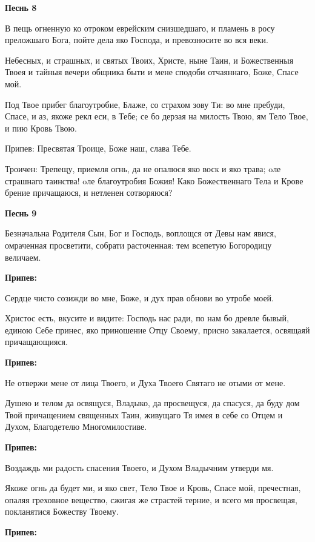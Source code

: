 \medskip
\bfseries Песнь 8\normalfont{}\nopagebreak


В пещь огненную ко отроком еврейским снизшедшаго, и пламень в росу преложшаго Бога, пойте дела яко Господа, и превозносите во вся веки.


Небесных, и страшных, и святых Твоих, Христе, ныне Таин, и Божественныя Твоея и тайныя вечери общника быти и мене сподоби отчаяннаго, Боже, Спасе мой.


Под Твое прибег благоутробие, Блаже, со страхом зову Ти: во мне пребуди, Спасе, и аз, якоже рекл еси, в Тебе; се бо дерзая на милость Твою, ям Тело Твое, и пию Кровь Твою.


Припев: Пресвятая Троице, Боже наш, слава Тебе.


Троичен: Трепещу, приемля огнь, да не опалюся яко воск и яко трава; oле страшнаго таинства! oле благоутробия Божия! Како Божественнаго Тела и Крове брение причащаюся, и нетленен сотворяюся?

\medskip
\bfseries Песнь 9\normalfont{}\nopagebreak


Безначальна Родителя Сын, Бог и Господь, воплощся от Девы нам явися, омраченная просветити, собрати расточенная: тем всепетую Богородицу величаем.

\medskip
\bfseries Припев:\normalfont{} 


Сердце чисто созижди во мне, Боже, и дух прав обнови во утробе моей.


Христос есть, вкусите и видите: Господь нас ради, по нам бо древле бывый, единою Себе принес, яко приношение Отцу Своему, присно закалается, освящаяй причащающияся.


\medskip
\bfseries Припев:\normalfont{} 


Не отвержи мене от лица Твоего, и Духа Твоего Святаго не отыми от мене.


Душею и телом да освящуся, Владыко, да просвещуся, да спасуся, да буду дом Твой причащением священных Таин, живущаго Тя имея в себе со Отцем и Духом, Благодетелю Многомилостиве.


\medskip
\bfseries Припев:\normalfont{} 


Воздаждь ми радость спасения Твоего, и Духом Владычним утверди мя.


Якоже огнь да будет ми, и яко свет, Тело Твое и Кровь, Спасе мой, пречестная, опаляя греховное вещество, сжигая же страстей терние, и всего мя просвещая, покланятися Божеству Твоему.


\medskip
\bfseries Припев:\normalfont{} 


